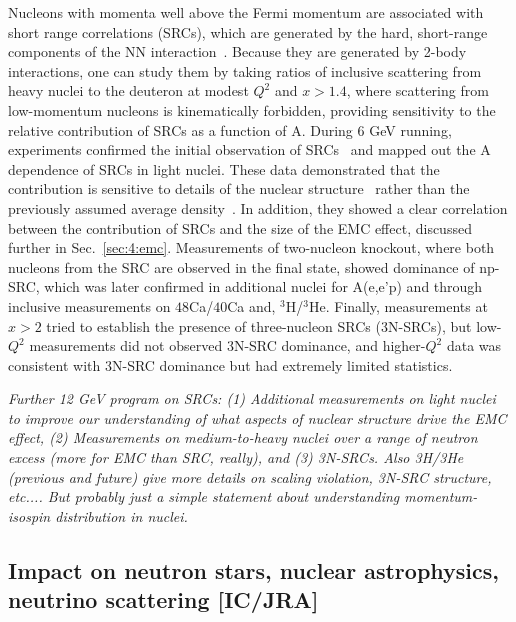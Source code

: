 Nucleons with momenta well above the Fermi momentum are associated with short range correlations (SRCs), which are generated by the hard, short-range components of the NN interaction~\cite{Frankfurt:1981mk, Frankfurt:1988nt, Sargsian:2002wc, Arrington:2011xs}. Because they are generated by 2-body interactions, one can study them by taking ratios of inclusive scattering from heavy nuclei to the deuteron at modest $Q^2$ and $x>1.4$, where scattering from low-momentum nucleons is kinematically forbidden, providing sensitivity to the relative contribution of SRCs as a function of A. During 6 GeV running, experiments confirmed the initial observation of SRCs~\cite{Frankfurt:1993sp} and mapped out the A dependence of SRCs in light nuclei. These data demonstrated that the contribution is sensitive to details of the nuclear structure~\cite{Seely:2009gt} rather than the previously assumed average density~\cite{Gomez:1993ri}. In addition, they showed a clear correlation between the contribution of SRCs and the size of the EMC effect, discussed further in Sec.~\ref{sec:4:emc}. Measurements of two-nucleon knockout, where both nucleons from the SRC are observed in the final state, showed dominance of np-SRC, which was later confirmed in additional nuclei for A(e,e'p) and through inclusive measurements on $48$Ca/$40$Ca and, $^3$H/$^3$He. Finally, measurements at $x>2$ tried to establish the presence of three-nucleon SRCs (3N-SRCs), but low-$Q^2$ measurements did not observed 3N-SRC dominance, and higher-$Q^2$ data was consistent with 3N-SRC dominance but had extremely limited statistics. 

\textit{Further 12 GeV program on SRCs: (1) Additional measurements on light nuclei to improve our understanding of what aspects of nuclear structure drive the EMC effect, (2) Measurements on medium-to-heavy nuclei over a range of neutron excess (more for EMC than SRC, really), and (3) 3N-SRCs.  Also 3H/3He (previous and future) give more details on scaling violation, 3N-SRC structure, etc....  But probably just a simple statement about understanding momentum-isospin distribution in nuclei.}




\subsection{Impact on neutron stars, nuclear astrophysics, neutrino scattering [IC/JRA]}
\label{sec:PREX}

